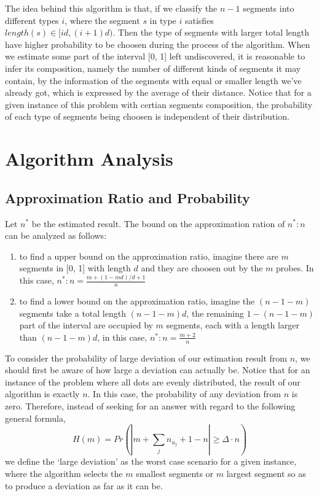 \documentclass[titlepage]{article}
\begin{document}
The idea behind this algorithm is that, if we classify the $n - 1$ segments into different types $i$, where the segment $s$ in type $i$ satisfies $length(s) \in [i d, (i + 1)d)$. Then the type of segments with larger total length have higher probability to be choosen during the process of the algorithm. When we estimate some part of the interval [0, 1] left undiscovered, it is reasonable to infer its composition, namely the number of different kinds of segments it may contain, by the information of the segments with equal or smaller length we've already got, which is expressed by the average of their distance. Notice that for a given instance of this problem with certian segments composition, the probability of each type of segments being choosen is independent of their distribution.

\section{Algorithm Analysis}
\subsection{Approximation Ratio and Probability}
Let $n^*$ be the estimated result. The bound on the approximation ration of $n^* : n$ can be analyzed as follows:
\begin{enumerate}
	\item to find a upper bound on the approximation ratio, imagine there are $m$ segments in [0, 1] with length $d$ and they are choosen out by the $m$ probes. In this case, $n^* : n = \frac{m + (1 - md) / d + 1}{n}$
	\item to find a lower bound on the approximation ratio, imagine the $(n - 1 - m)$ segments take a total length $(n - 1 - m)d$, the remaining $1 - (n - 1 - m)$ part of the interval are occupied by $m$ segments, each with a length larger than $(n - 1 - m)d$, in this case, $n^* : n = \frac{m + 2}{n}$
\end{enumerate}

To consider the probability of large deviation of our estimation result from $n$, we should first be aware of how large a deviation can actually be. Notice that for an instance of the problem where all dots are evenly distributed, the result of our algorithm is exactly $n$. In this case, the probability of any deviation from $n$ is zero. Therefore, instead of seeking for an answer with regard to the following general formula,
\[ H(m) = Pr(|m + \sum_{j}n_{u_j} + 1 - n| \geq \Delta \cdot n)\]
we define the `large deviation' as the worst case scenario for a given instance, where the algorithm selects the $m$ smallest segments or $m$ largest segment so as to produce a deviation as far as it can be.
\end{document}

